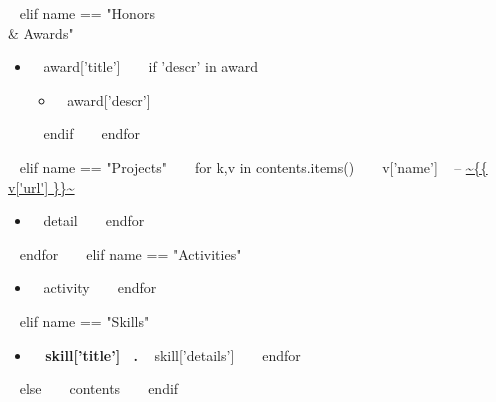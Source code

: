   \begin{minipage}{\textwidth}
  \printbibliography[
    heading=none,type=article,keyword=journal,
    resetnumbers=true,prefixnumbers=J
  ]
  \printbibliography[
    heading=none,type=article,keyword=magazine,
    resetnumbers=true,prefixnumbers=M
  ]
  \bigskip

~{ elif name == "Honors \\& Awards" }~
  \begin{itemize}
    ~{ for award in contents }~
      \item ~{{ award['title'] }}~
      ~{ if 'descr' in award }~
        \begin{itemize}
          \item ~{{ award['descr'] }}~
        \end{itemize}
      ~{ endif }~
    ~{ endfor }~
  \end{itemize}
  \bigskip
~{ elif name == "Projects" }~
  ~{ for k,v in contents.items() }~
    {\large ~{{ v['name'] }}~ -- \url{ ~{{ v['url'] }}~ } }
    \begin{itemize}
      ~{ for detail in v['details'] }~
        \item ~{{ detail }}~
      ~{ endfor }~
    \end{itemize}
    \bigskip
  ~{ endfor }~
~{ elif name == "Activities" }~
  \begin{itemize}
    ~{ for activity in contents }~
      \item ~{{ activity }}~
    ~{ endfor }~
  \end{itemize}
  \bigskip
~{ elif name == "Skills" }~
  \begin{itemize}
    ~{ for skill in contents }~
      \item { \bf ~{{ skill['title'] }}~. } ~{{ skill['details'] }}~
    ~{ endfor }~
  \end{itemize}
  \bigskip
~{ else }~
  ~{{ contents }}~
  \bigskip
~{ endif }~
\end{minipage}
